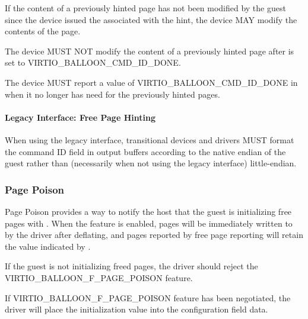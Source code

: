 If the content of a previously hinted page has not been modified by the
guest since the device issued the  associated
with the hint, the device MAY modify the contents of the page.

The device MUST NOT modify the content of a previously hinted page after
 is set to VIRTIO_BALLOON_CMD_ID_DONE.

The device MUST report a value of VIRTIO_BALLOON_CMD_ID_DONE in
 when it no longer has need for the
previously hinted pages.

\paragraph{Legacy Interface: Free Page Hinting}\label{sec:Device Types / Memory Balloon Device / Device Operation / Free Page Hinting / Legacy Interface: Free Page Hinting}

When using the legacy interface, transitional devices and drivers MUST
format the command ID field in output buffers according to the native
endian of the guest rather than (necessarily when not using the legacy
interface) little-endian.

\subsubsection{Page Poison}\label{sec:Device Types / Memory Balloon Device / Device Operation / Page Poison}

Page Poison provides a way to notify the host that the guest is initializing
free pages with . When the feature is enabled, pages will
be immediately written to by the driver after deflating, and pages reported
by free page reporting will retain the value indicated by .

If the guest is not initializing freed pages, the driver should reject the
VIRTIO_BALLOON_F_PAGE_POISON feature.

If VIRTIO_BALLOON_F_PAGE_POISON feature has been negotiated, the driver
will place the initialization value into the 
configuration field data.


